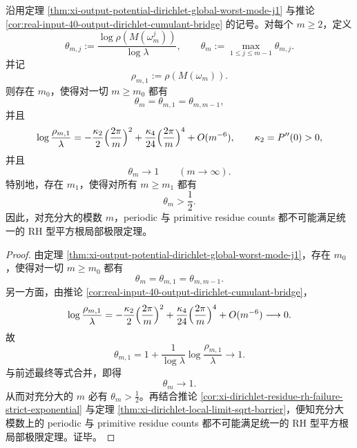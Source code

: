 \begin{theorem}\label{thm:xi-output-potential-dirichlet-index-to-one-all-moduli}
沿用定理 \ref{thm:xi-output-potential-dirichlet-global-worst-mode-j1} 与推论 \ref{cor:real-input-40-output-dirichlet-cumulant-bridge} 的记号。对每个 \(m\ge 2\)，定义
\[
\theta_{m,j}:=\frac{\log\rho(M(\omega_m^j))}{\log\lambda},
\qquad
\theta_m:=\max_{1\le j\le m-1}\theta_{m,j}.
\]
并记
\[
\rho_{m,1}:=\rho(M(\omega_m)).
\]
则存在 \(m_0\)，使得对一切 \(m\ge m_0\) 都有
\[
\theta_m=\theta_{m,1}=\theta_{m,m-1},
\]
并且
\[
\log\frac{\rho_{m,1}}{\lambda}
=
-\frac{\kappa_2}{2}\Bigl(\frac{2\pi}{m}\Bigr)^2
+\frac{\kappa_4}{24}\Bigl(\frac{2\pi}{m}\Bigr)^4
+O(m^{-6}),
\qquad
\kappa_2=P''(0)>0,
\]
并且
\[
\theta_m\longrightarrow 1
\qquad(m\to\infty).
\]
特别地，存在 \(m_1\)，使得对所有 \(m\ge m_1\) 都有
\[
\theta_m>\frac12.
\]
因此，对充分大的模数 \(m\)，periodic 与 primitive residue counts 都不可能满足统一的 RH 型平方根局部极限定理。
\end{theorem}
\begin{proof}
由定理 \ref{thm:xi-output-potential-dirichlet-global-worst-mode-j1}，存在 \(m_0\)，使得对一切 \(m\ge m_0\) 都有
\[
\theta_m=\theta_{m,1}=\theta_{m,m-1}.
\]
另一方面，由推论 \ref{cor:real-input-40-output-dirichlet-cumulant-bridge}，
\[
\log\frac{\rho_{m,1}}{\lambda}
=
-\frac{\kappa_2}{2}\Bigl(\frac{2\pi}{m}\Bigr)^2
+\frac{\kappa_4}{24}\Bigl(\frac{2\pi}{m}\Bigr)^4
+O(m^{-6})
\longrightarrow 0.
\]
故
\[
\theta_{m,1}
=
1+\frac{1}{\log\lambda}\log\frac{\rho_{m,1}}{\lambda}
\longrightarrow 1.
\]
与前述最终等式合并，即得
\[
\theta_m\longrightarrow 1.
\]
从而对充分大的 \(m\) 必有 \(\theta_m>\frac12\)。再结合推论
\ref{cor:xi-dirichlet-residue-rh-failure-strict-exponential} 与定理
\ref{thm:xi-dirichlet-local-limit-sqrt-barrier}，便知充分大模数上的 periodic 与 primitive residue counts 都不可能满足统一的 RH 型平方根局部极限定理。证毕。
\end{proof}

